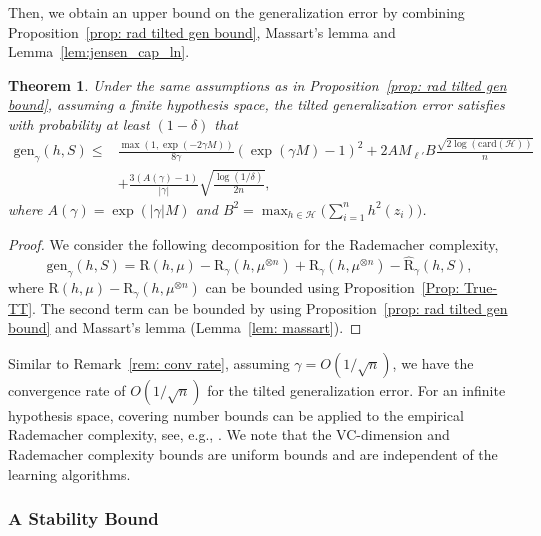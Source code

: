 \documentclass{article}
\theoremstyle{plain}
\theoremstyle{plain}
\newtheorem{theorem}{Theorem}[section]
\theoremstyle{definition}
\theoremstyle{remark}
\newcommand{\RTERM}{\widehat{\mathrm{R}}_{\gamma}}
\newcommand{\RTrue}{\mathrm{R}}
\newcommand{\RTET}{\mathrm{R}_{\gamma}}
\begin{document}
Then, we  obtain an upper bound on the generalization error by combining Proposition~\ref{prop: rad tilted gen bound}, Massart’s lemma \citep{massart2000some} and Lemma~\ref{lem:jensen_cap_ln}.
\begin{tcolorbox}
    \begin{theorem}\label{thm: rad bound}
    Under the same assumptions as in Proposition~\ref{prop: rad tilted gen bound}, assuming a finite hypothesis space, the tilted generalization error satisfies with probability at least $(1-\delta)$ that 
    \begin{equation*}
        \begin{split}
             \mathrm{gen}_{\gamma}(h,S)\leq &\frac{\max(1,\exp(-2\gamma M))}{8\gamma}(\exp(\gamma M)-1)^2+ 2A M_{\ell'}B\frac{\sqrt{2\log(\mathrm{card}(\mathcal{H}))}}{n}\\
             &+  \frac{3(A(\gamma)-1) }{|\gamma|} \sqrt{\frac{\log(1/\delta)}{2n}},
        \end{split}
    \end{equation*}
    where $A(\gamma)=\exp(|\gamma| M)$ and $B^2=\max_{h\in\mathcal{H}}\Big(\sum_{i=1}^n h^2(z_i)\Big)$.
\end{theorem}
\end{tcolorbox}

\begin{proof}
We consider the following decomposition for the Rademacher complexity,
\[\mathrm{gen}_{\gamma}(h,S)=   \RTrue(h,\mu)- \RTET(h,\mu^{\otimes n})+ \RTET(h,\mu^{\otimes n})-\RTERM(h,S),\]
where $\RTrue(h,\mu)- \RTET(h,\mu^{\otimes n})$ can be bounded using Proposition~\ref{Prop: True-TT}. The second term can be bounded by using Proposition~\ref{prop: rad tilted gen bound} and  
   Massart’s lemma (Lemma~\ref{lem: massart}).
\end{proof}

Similar to Remark~\ref{rem: conv rate}, assuming $\gamma= O(1/\sqrt{n})$, we have the convergence rate of $O(1/\sqrt{n})$ for the tilted generalization error. For an infinite %
hypothesis space,  covering number bounds can be applied to the empirical Rademacher complexity, see, e.g., \citep{kakade2008complexity}. 
We note that the VC-dimension and Rademacher complexity bounds are uniform bounds and are independent of the learning algorithms.



\subsubsection{A Stability Bound}\label{sec: stable bound}
\end{document}
